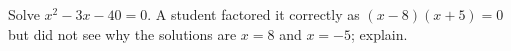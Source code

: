 Solve $x^2-3x-40=0$. A student factored it correctly as $(x-8)(x+5)=0$ but did not see why the solutions are $x=8$ and $x=-5$; explain.
